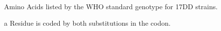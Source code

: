 \documentclass{report}
\begin{document}
\begin{table}[h]
	\centering
	\caption{Amino Acids listed by the WHO standard genotype for 17DD strains.}
		\begin{ThreePartTable}
		
		\begin{tablenotes}
			\item[a]Residue is coded by both substitutions in the codon.
		\end{tablenotes}
		\end{ThreePartTable}
		\label{my-label}
\end{table}
\end{document}
